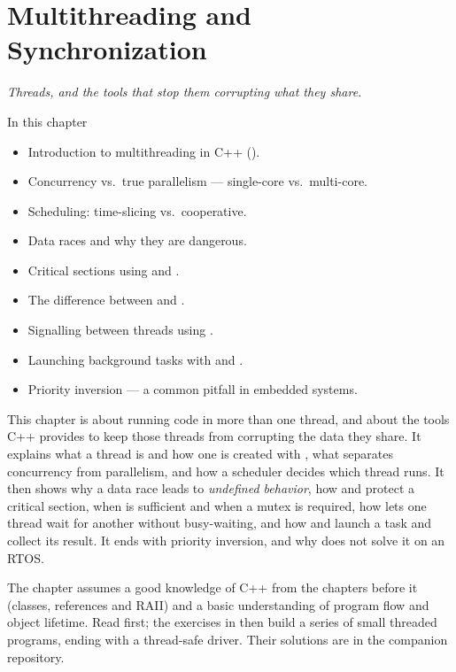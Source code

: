 
\chapter{Multithreading and Synchronization}
\label{c6:ch:threads}

{\large\itshape Threads, and the tools that stop them corrupting what they share.\par}

\begin{chapterbox}{In this chapter}
\begin{itemize}
  \item Introduction to multithreading in C++ ().
  \item Concurrency vs.\ true parallelism --- single-core vs.\ multi-core.
  \item Scheduling: time-slicing vs.\ cooperative.
  \item Data races and why they are dangerous.
  \item Critical sections using  and .
  \item The difference between  and .
  \item Signalling between threads using .
  \item Launching background tasks with  and .
  \item Priority inversion --- a common pitfall in embedded systems.
\end{itemize}
\end{chapterbox}

This chapter is about running code in more than one thread, and about the tools C++ provides to
keep those threads from corrupting the data they share. It explains what a thread is and how one
is created with , what separates concurrency from parallelism, and how a
scheduler decides which thread runs. It then shows why a data race leads to \emph{undefined
behavior}, how  and  protect a critical section, when
 is sufficient and when a mutex is required, how 
lets one thread wait for another without busy-waiting, and how  and
 launch a task and collect its result. It ends with priority inversion, and why
 does not solve it on an RTOS.

The chapter assumes a good knowledge of C++ from the chapters before it (classes, references and
RAII) and a basic understanding of program flow and object lifetime. Read
 first; the exercises in  then build a series of
small threaded programs, ending with a thread-safe driver. Their solutions are in the
companion repository.




